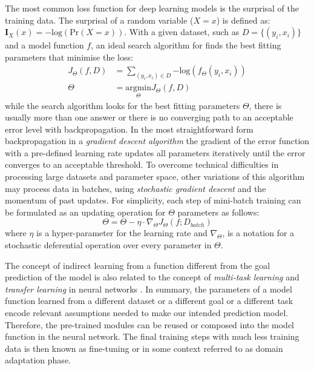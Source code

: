The most common loss function for deep learning models is the surprisal of the training data. The surprisal of a random variable ($X=x$) is defined as: 
$\bm{I}_X(x) = -\mathrm{log}(\mathrm{Pr}(X=x))$. 
With a given dataset, such as $D = \{(y_i, x_i)\}$ and a model function $f$, an ideal search algorithm for finds the best fitting parameters that minimise the loss:
\begin{align}
J_\Theta(f,D) &= \sum_{(y_i, x_i) \in D}{-\mathrm{log}(f_{\Theta}(y_i, x_i))} \\
\Theta &= \underset{\Theta}{\mathrm{argmin}} J_\Theta(f,D)
\end{align}
\noindent while the search algorithm looks for the best fitting parameters $\Theta$, there is usually more than one answer or there is no converging path to an acceptable error level with backpropagation. In the most straightforward form \textemdash  backpropagation in a \emph{gradient descent algorithm} \textemdash  the gradient of the error function with a pre-defined learning rate updates all parameters iteratively until the error converges to an acceptable threshold. 
To overcome technical difficulties in processing large datasets and parameter space, other variations of this algorithm may process data in batches, using \emph{stochastic gradient descent} and the momentum of past updates. 
For simplicity, each step of mini-batch training can be formulated as an updating operation for $\Theta$ parameters as follows: 
\begin{equation*}
\Theta = \Theta - \eta \cdot \nabla_\Theta J_\Theta(f; D_{batch})
\end{equation*}
\noindent
where $\eta$ is a hyper-parameter for the learning rate and $\nabla_\Theta$, is a notation for a stochastic deferential operation over every parameter in $\Theta$.

The concept of indirect learning from a function different from the goal prediction of the model is also related to the concept of \emph{multi-task learning} and \emph{transfer learning} in neural networks \citep[Chapter~15]{Goodfellow-et-al-2016}. 
In summary, the parameters of a model function learned from a different dataset or a different goal or a different task encode relevant assumptions needed to make our intended prediction model.
Therefore, the pre-trained modules can be reused or composed into the model function in the neural network. 
The final training steps with much less training data is then known as fine-tuning or in some context referred to as domain adaptation phase.


